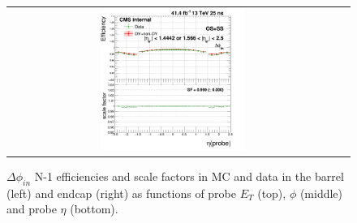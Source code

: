 \begin{figure}[bh]
\begin{center}
\begin{tabular}{cc}
      \includegraphics[width=0.45\textwidth]{figures/Zprime/2017/ScaleFactor/SameSign/N-1/g_compare_cut_eta_Barrel+Endcap_ea_ta_inc_AS_N_1_DPhiIn_PUW.png}
    \end{tabular}
    \caption{$\Delta \phi_{in}$ N-1 efficiencies and scale factors in MC and data in the barrel (left) and endcap (right) as functions of probe $E_T$ (top), $\phi$ (middle) and probe $\eta$ (bottom).}
    \label{fig:DPhiIn_2017}
  \end{center}
\end{figure}

